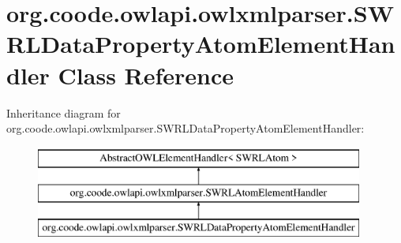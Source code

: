 \hypertarget{classorg_1_1coode_1_1owlapi_1_1owlxmlparser_1_1_s_w_r_l_data_property_atom_element_handler}{\section{org.\-coode.\-owlapi.\-owlxmlparser.\-S\-W\-R\-L\-Data\-Property\-Atom\-Element\-Handler Class Reference}
\label{classorg_1_1coode_1_1owlapi_1_1owlxmlparser_1_1_s_w_r_l_data_property_atom_element_handler}
}
Inheritance diagram for org.\-coode.\-owlapi.\-owlxmlparser.\-S\-W\-R\-L\-Data\-Property\-Atom\-Element\-Handler\-:\begin{figure}[H]
\begin{center}
\leavevmode
\includegraphics[height=3.000000cm]{classorg_1_1coode_1_1owlapi_1_1owlxmlparser_1_1_s_w_r_l_data_property_atom_element_handler}
\end{center}
\end{figure}
